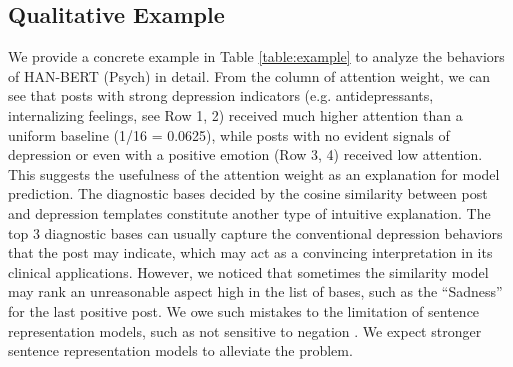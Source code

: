 \subsection{Qualitative Example}

We provide a concrete example in Table \ref{table:example} to analyze the behaviors of HAN-BERT (Psych) in detail. From the column of attention weight, we can see that posts with strong depression indicators (e.g. antidepressants, internalizing feelings, see Row 1, 2) received much higher attention than a uniform baseline (1/16 = 0.0625), while posts with no evident signals of depression or even with a positive emotion (Row 3, 4) received low attention. This suggests the usefulness of the attention weight as an explanation for model prediction. The diagnostic bases decided by the cosine similarity between post and depression templates constitute another type of intuitive explanation. The top 3 diagnostic bases can usually capture the conventional depression behaviors that the post may indicate, which may act as a convincing interpretation in its clinical applications. However, we noticed that sometimes the similarity model may rank an unreasonable aspect high in the list of bases, such as the ``Sadness'' for the last positive post. We owe such mistakes to the limitation of sentence representation models, such as not sensitive to negation \cite{ribeiro2020beyond}. We expect stronger sentence representation models to alleviate the problem.
